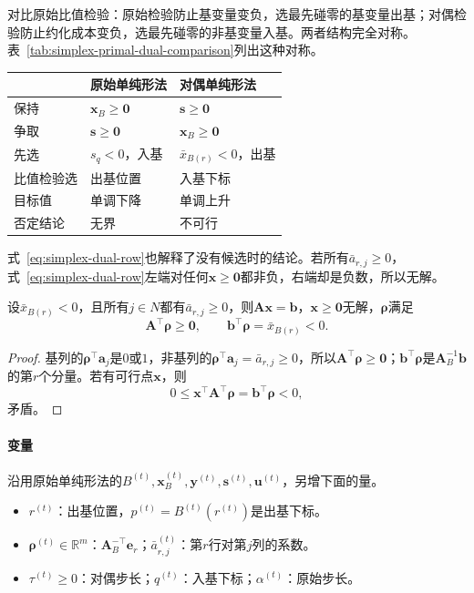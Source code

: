 对比原始比值检验：原始检验防止基变量变负，选最先碰零的基变量出基；对偶检验防止约化成本变负，选最先碰零的非基变量入基。两者结构完全对称。表~\ref{tab:simplex-primal-dual-comparison}列出这种对称。

\begin{BookInlineTable}
 \centering
 \begin{tabular}{lll}
  \toprule
  & 原始单纯形法 & 对偶单纯形法\\
  \midrule
  保持 & $\bm{x}_B\geq\bm{0}$ & $\bm{s}\geq\bm{0}$\\
  争取 & $\bm{s}\geq\bm{0}$ & $\bm{x}_B\geq\bm{0}$\\
  先选 & $s_q<0$，入基 & $\bar{x}_{B(r)}<0$，出基\\
  比值检验选 & 出基位置 & 入基下标\\
  目标值 & 单调下降 & 单调上升\\
  否定结论 & 无界 & 不可行\\
  \bottomrule
 \end{tabular}
 \caption{原始单纯形法与对偶单纯形法的对照。}
 \label{tab:simplex-primal-dual-comparison}
\end{BookInlineTable}

式~\eqref{eq:simplex-dual-row}也解释了没有候选时的结论。若所有$\bar{a}_{r,j}\geq0$，式~\eqref{eq:simplex-dual-row}左端对任何$\bm{x}\geq\bm{0}$都非负，右端却是负数，所以无解。

\begin{theorem}[对偶单纯形法的不可行证书]
 \label{thm:simplex-dual-infeasible}
 设$\bar{x}_{B(r)}<0$，且所有$j\in N$都有$\bar{a}_{r,j}\geq0$，则$\bm{A}\bm{x}=\bm{b}$，$\bm{x}\geq\bm{0}$无解，$\bm{\rho}$满足
 \begin{equation}
  \bm{A}^\top\bm{\rho}\geq\bm{0},\qquad \bm{b}^\top\bm{\rho}=\bar{x}_{B(r)}<0.
  \label{eq:simplex-dual-certificate}
 \end{equation}
\end{theorem}

\begin{proof}
 基列的$\bm{\rho}^\top\bm{a}_j$是$0$或$1$，非基列的$\bm{\rho}^\top\bm{a}_j=\bar{a}_{r,j}\geq0$，所以$\bm{A}^\top\bm{\rho}\geq\bm{0}$；$\bm{b}^\top\bm{\rho}$是$\bm{A}_B^{-1}\bm{b}$的第$r$个分量。若有可行点$\bm{x}$，则
 \[
  0\leq\bm{x}^\top\bm{A}^\top\bm{\rho}=\bm{b}^\top\bm{\rho}<0,
 \]
 矛盾。
\end{proof}

\paragraph{变量}
沿用原始单纯形法的$B^{(t)},\bm{x}_B^{(t)},\bm{y}^{(t)},\bm{s}^{(t)},\bm{u}^{(t)}$，另增下面的量。
\begin{itemize}
 \item $r^{(t)}$：出基位置，$p^{(t)}=B^{(t)}(r^{(t)})$是出基下标。
 \item $\bm{\rho}^{(t)}\in\mathbb{R}^m$：$\bm{A}_B^{-\top}\bm{e}_r$；$\bar{a}_{r,j}^{(t)}$：第$r$行对第$j$列的系数。
 \item $\tau^{(t)}\geq0$：对偶步长；$q^{(t)}$：入基下标；$\alpha^{(t)}$：原始步长。
\end{itemize}

